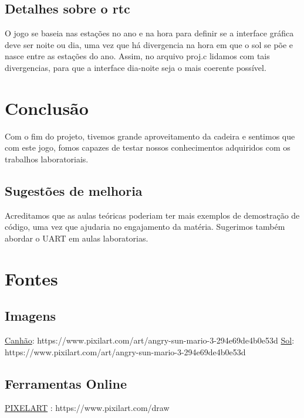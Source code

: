 \documentclass[12pt]{article}
\begin{document}
\subsection{Detalhes sobre o rtc} 
O jogo se baseia nas estações no ano e na hora para definir se a interface gráfica deve ser noite ou dia, uma vez que há divergencia
na hora em que o sol se põe e nasce entre as estações do ano. Assim, no arquivo proj.c lidamos com tais divergencias, para que a 
interface dia-noite seja o mais coerente possível. 
\newpage 
\section{Conclusão} 
Com o fim do projeto, tivemos grande aproveitamento da cadeira e sentimos que com este jogo, fomos capazes de testar nossos conhecimentos adquiridos com
os trabalhos laboratoriais. \newline 
\subsection{Sugestões de melhoria}
Acreditamos que as aulas teóricas poderiam ter mais exemplos de demostração de código, uma vez que ajudaria no engajamento da matéria. \newline
Sugerimos também abordar o UART em aulas laboratorias. \newline 

\section{Fontes}
\subsection{Imagens}
\href{https://www.freepik.com/free-icon/circus-cannon_770308.htm}{Canhão}: https://www.pixilart.com/art/angry-sun-mario-3-294e69de4b0e53d\newline
\href{https://www.pixilart.com/art/angry-sun-mario-3-294e69de4b0e53d}{Sol}: https://www.pixilart.com/art/angry-sun-mario-3-294e69de4b0e53d 
\subsection{Ferramentas Online}
\href{https://www.pixilart.com/draw}{PIXELART} : https://www.pixilart.com/draw \newline
\end{document}
